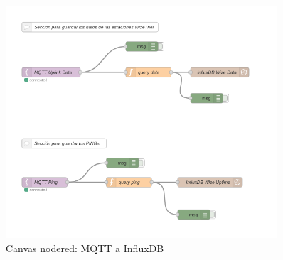 \documentclass[12pt]{article}
\begin{document}
\begin{figure}[h]
	\begin{center}
		\includegraphics[width=0.9\textwidth]{img_rani/nodered_mqtt.png}
		\caption{Canvas nodered: MQTT a InfluxDB}
	\end{center}
\end{figure}

\pagebreak

\listoffigures
\end{document}
